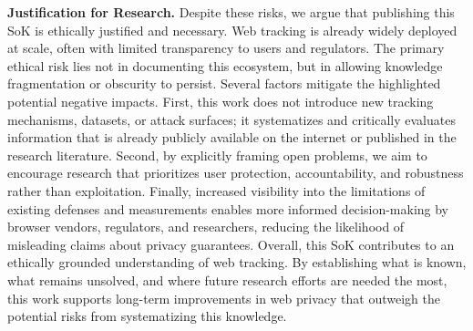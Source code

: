 \noindent \textbf{Justification for Research.}
%
Despite these risks, we argue that publishing this SoK is ethically justified and necessary.
%
Web tracking is already widely deployed at scale, often with limited transparency to users and regulators.
%
The primary ethical risk lies not in documenting this ecosystem, but in allowing knowledge fragmentation or obscurity to persist.
%
Several factors mitigate the highlighted potential negative impacts.
%
First, this work does not introduce new tracking mechanisms, datasets, or attack surfaces; it systematizes and critically evaluates information that is already publicly available on the internet or published in the research literature.
%
Second, by explicitly framing open problems, we aim to encourage research that prioritizes user protection, accountability, and robustness rather than exploitation.
%
Finally, increased visibility into the limitations of existing defenses and measurements enables more informed decision-making by browser vendors, regulators, and researchers, reducing the likelihood of misleading claims about privacy guarantees.
%
Overall, this SoK contributes to an ethically grounded understanding of web tracking.
%
By establishing what is known, what remains unsolved, and where future research efforts are needed the most, this work supports long-term improvements in web privacy that outweigh the potential risks from systematizing this knowledge.